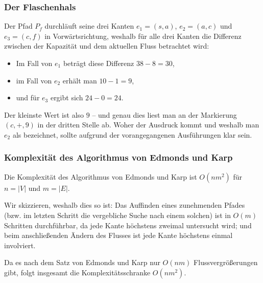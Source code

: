 \documentclass[smaller]{beamer}
\begin{document}
\begin{frame}
 \frametitle{Der Flaschenhals}
 Der Pfad $P_f$ durchläuft seine drei Kanten $e_1=(s,a)$, $e_2=(a,c)$ und $e_3=(c,f)$ in Vorwärtsrichtung, weshalb für alle drei Kanten die Differenz zwischen der Kapazität und dem aktuellen Fluss betrachtet wird: \vspace*{0.2cm}
 \begin{itemize}
 \item Im Fall von $e_1$ beträgt diese Differenz $38-8=30$,
 \item im Fall von $e_2$ erhält man $10-1=9$, 
 \item und für $e_3$ ergibt sich $24-0=24$.
 \end{itemize}
 
 \vspace*{0.2cm}
 \alert{Der kleinste Wert ist also $9$} -- und genau dies liest man an der Markierung $(c,+,9)$ in der dritten Stelle ab. Woher der Ausdruck  kommt und weshalb man $e_2$ als  bezeichnet, sollte aufgrund der vorangegangenen Ausführungen klar sein.
\end{frame}

\begin{frame}
 \frametitle{Komplexität des Algorithmus von Edmonds und Karp}
 Die Komplexität des Algorithmus von Edmonds und Karp ist \alert{$O(nm^2)$} für $n=|V|$ und $m=|E|$. \\ \vspace*{0.2cm}
 
 \alert{Wir skizzieren, weshalb dies so ist:} Das Auffinden eines zunehmenden Pfades (bzw. im letzten Schritt die vergebliche Suche nach einem solchen) ist in $O(m)$ Schritten durchführbar, da jede Kante höchstens zweimal untersucht wird; und beim anschließenden Ändern des Flusses ist jede Kante höchstens einmal involviert. \\ \vspace*{0.2cm}
 
 Da es nach dem Satz von Edmonds und Karp nur $O(nm)$ Flussvergrößerungen gibt, folgt insgesamt die Komplexitätsschranke $O(nm^2)$.
\end{frame}
\end{document}
